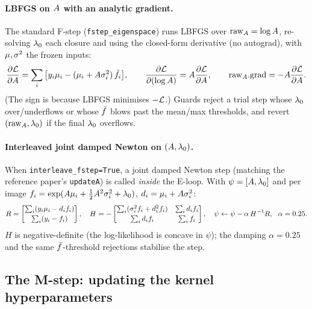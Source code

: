 \paragraph{LBFGS on $A$ with an analytic gradient.}
The standard F-step (\texttt{fstep\_eigenspace}) runs LBFGS over
$\mathrm{raw}_A=\log A$, re-solving $\lambda_{0}$ each closure and using the
closed-form derivative (no autograd), with $\mu,\sigma^{2}$ the frozen inputs:
\begin{equation}
\frac{\partial\mathcal{L}}{\partial A}
  = \sum_i\big[y_i\mu_i-(\mu_i+A\sigma^{2}_i)\,\bar{f}_i\big],
\qquad
\frac{\partial\mathcal{L}}{\partial(\log A)}=A\frac{\partial\mathcal{L}}{\partial A},
\qquad
\mathrm{raw}_A.\mathrm{grad}=-A\frac{\partial\mathcal{L}}{\partial A}.
\end{equation}
(The sign is because LBFGS minimises $-\mathcal{L}$.) Guards reject a trial step whose
$\lambda_{0}$ over/underflows or whose $\bar{f}$ blows past the mean/max thresholds, and
revert $(\mathrm{raw}_A,\lambda_{0})$ if the final $\lambda_{0}$ overflows.

\paragraph{Interleaved joint damped Newton on $(A,\lambda_{0})$.}
When \texttt{interleave\_fstep=True}, a joint damped Newton step (matching the
reference paper's \texttt{updateA}) is called \emph{inside} the E-loop. With
$\psi=[A,\lambda_{0}]$ and per image
$f_i=\exp(A\mu_i+\tfrac12A^2\sigma^{2}_i+\lambda_{0})$,
$d_i=\mu_i+A\sigma^{2}_i$:
\begin{equation}
R=\begin{bmatrix}\sum_i(y_i\mu_i-d_if_i)\\[2pt]\sum_i(y_i-f_i)\end{bmatrix},
\quad
H=-\begin{bmatrix}\sum_i(\sigma^{2}_if_i+d_i^2f_i)&\sum_i d_if_i\\[2pt]
                  \sum_i d_if_i&\sum_if_i\end{bmatrix},
\quad
\psi\leftarrow\psi-\alpha\,H^{-1}R,\ \ \alpha=0.25.
\end{equation}
$H$ is negative-definite (the log-likelihood is concave in $\psi$); the damping
$\alpha=0.25$ and the same $\bar{f}$-threshold rejections stabilise the step.

\subsection{The M-step: updating the kernel hyperparameters}
\label{subsec:mstep}

